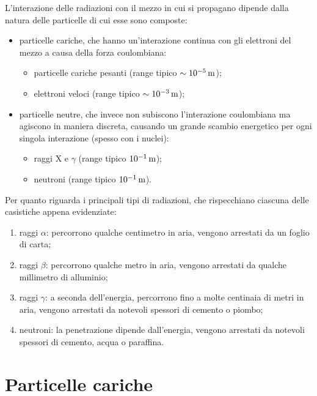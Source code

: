 
L'interazione delle radiazioni con il mezzo in cui si propagano dipende dalla natura delle particelle di cui esse sono composte:
\begin{itemize}
	\item particelle cariche, che hanno un'interazione continua con gli elettroni del mezzo a causa della forza coulombiana:
	\begin{itemize}
		\item particelle cariche pesanti (range tipico $ \sim 10^{-5} \,\mathrm{m} $);
		\item elettroni veloci (range tipico $ \sim 10^{-3} \,\mathrm{m} $);
	\end{itemize}
	\item particelle neutre, che invece non subiscono l'interazione coulombiana ma agiscono in maniera discreta, causando un grande scambio energetico per ogni singola interazione (spesso con i nuclei):
	\begin{itemize}
		\item raggi X e $ \gamma $ (range tipico $ 10^{-1} \,\mathrm{m} $);
		\item neutroni (range tipico $ 10^{-1} \,\mathrm{m} $).
	\end{itemize}
\end{itemize}
Per quanto riguarda i principali tipi di radiazioni, che rispecchiano ciascuna delle casistiche appena evidenziate:
\begin{enumerate}
	\item raggi $ \alpha $: percorrono qualche centimetro in aria, vengono arrestati da un foglio di carta;
	\item raggi $ \beta $: percorrono qualche metro in aria, vengono arrestati da qualche millimetro di alluminio;
	\item raggi $ \gamma $: a seconda dell'energia, percorrono fino a molte centinaia di metri in aria, vengono arrestati da notevoli spessori di cemento o piombo;
	\item neutroni: la penetrazione dipende dall'energia, vengono arrestati da notevoli spessori di cemento, acqua o paraffina.
\end{enumerate}

\section{Particelle cariche}


